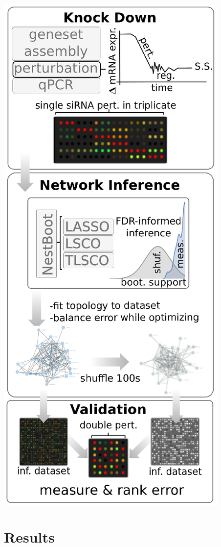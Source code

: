 \documentclass[a0,portrait]{a0poster}
\begin{document}
\begin{multicols}{2}
\begin{center}
\includegraphics[width=.6\linewidth]{MYC_analysis_C.eps}
\end{center}


\section*{Results}



\end{multicols}
\end{document}
